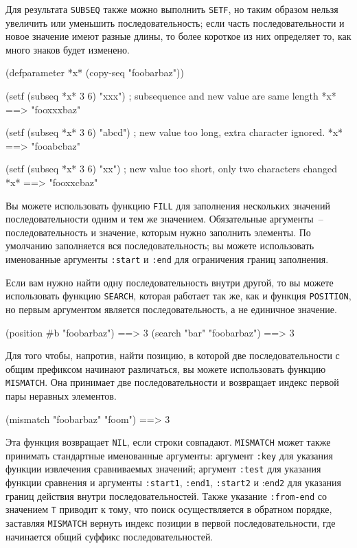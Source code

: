 Для результата \lstinline{SUBSEQ} также можно выполнить \lstinline{SETF}, но таким образом нельзя увеличить
или уменьшить последовательность; если часть последовательности и новое значение имеют
разные длины, то более короткое из них определяет то, как много знаков будет изменено.

\begin{myverb}
(defparameter *x* (copy-seq "foobarbaz"))

(setf (subseq *x* 3 6) "xxx")  ; subsequence and new value are same length
*x* ==> "fooxxxbaz"

(setf (subseq *x* 3 6) "abcd") ; new value too long, extra character ignored.
*x* ==> "fooabcbaz"

(setf (subseq *x* 3 6) "xx")   ; new value too short, only two characters changed
*x* ==> "fooxxcbaz"
\end{myverb}

Вы можете использовать функцию \lstinline{FILL} для заполнения нескольких значений
последовательности одним и тем же значением.  Обязательные аргументы~--
последовательность и значение, которым нужно заполнить элементы.  По умолчанию
заполняется вся последовательность; вы можете использовать именованные аргументы
\lstinline{:start} и \lstinline{:end} для ограничения границ заполнения.

Если вам нужно найти одну последовательность внутри другой, то вы можете использовать
функцию \lstinline{SEARCH}, которая работает так же, как и функция \lstinline{POSITION}, но первым
аргументом является последовательность, а не единичное значение.

\begin{myverb}
(position #\bslash{}b "foobarbaz") ==> 3
(search "bar" "foobarbaz") ==> 3
\end{myverb}

Для того чтобы, напротив, найти позицию, в которой две последовательности с общим
префиксом начинают различаться, вы можете использовать функцию \lstinline{MISMATCH}.  Она
принимает две последовательности и возвращает индекс первой пары неравных элементов.

\begin{myverb}
  (mismatch "foobarbaz" "foom") ==> 3
\end{myverb}

Эта функция возвращает \lstinline{NIL}, если строки совпадают. \lstinline{MISMATCH} может также
принимать стандартные именованные аргументы: аргумент \lstinline{:key} для указания функции
извлечения сравниваемых значений; аргумент \lstinline{:test} для указания функции сравнения и
аргументы \lstinline{:start1}, \lstinline{:end1}, \lstinline{:start2} и :\lstinline{end2} для указания границ
действия внутри последовательностей.  Также указание \lstinline{:from-end} со значением
\lstinline{T} приводит к тому, что поиск осуществляется в обратном порядке, заставляя
\lstinline{MISMATCH} вернуть индекс позиции в первой последовательности, где начинается общий
суффикс последовательностей.

